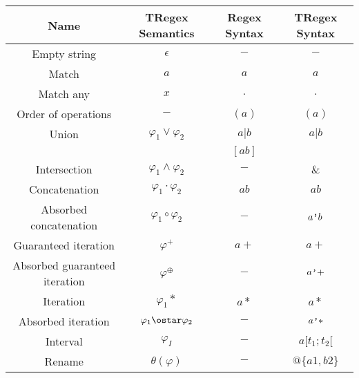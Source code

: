 \begin{tabular}{ |c|c|c|c| }
    \hline
    \textbf{Name} & \textbf{TRegex Semantics} & \textbf{Regex Syntax} & \textbf{TRegex Syntax} \\
    \hline
    Empty string & $\epsilon$ & $-$ & $-$ \\
    \hline
    Match & $a$ & $a$ & $a$ \\
    \hline
    Match any & $x$ & $.$ & $.$ \\
    \hline
    Order of operations & $-$ & $(a)$ & $(a)$ \\
    \hline
    Union & $\varphi_1\vee\varphi_2$ & $a|b$ & $a|b$ \\
    & & $[ab]$ &  \\
    \hline
    Intersection & $\varphi_1\wedge\varphi_2$ & $-$ & $\&$ \\
    \hline
    Concatenation & $\varphi_1\cdot\varphi_2$ & $ab$ & $ab$ \\
    \hline
    Absorbed concatenation & $\varphi_1\circ\varphi_2$ & $-$ & $a\verb|'|b$ \\
    \hline
    Guaranteed iteration & $\varphi^+$ & $a+$ & $a+$ \\
    \hline
    Absorbed guaranteed iteration & $\varphi^\oplus$ & $-$ & $a\verb|'|+$ \\
    \hline
    Iteration & $\varphi_1*$ & $a*$ & $a*$ \\
    \hline
    Absorbed iteration & $\varphi_1\ostar\varphi_2$ & $-$ & $a\verb|'|*$ \\
    \hline
    Interval & $\varphi_I$ & $-$ & $a[t_1;t_2[$ \\
    \hline
    Rename & $\theta(\varphi)$ & $-$ & $@\{a1,b2\}$ \\
    \hline
\end{tabular}\cite*{Eugene2001}\cite*{Masaki2018}